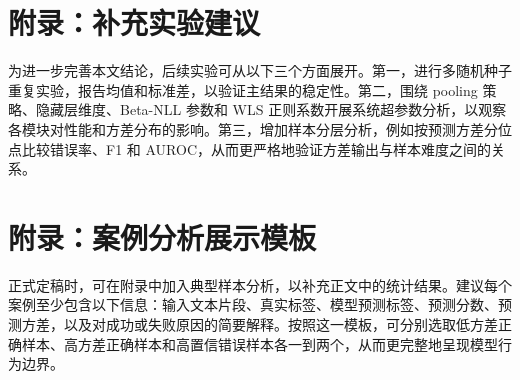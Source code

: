 \section{附录：补充实验建议}
为进一步完善本文结论，后续实验可从以下三个方面展开。第一，进行多随机种子重复实验，报告均值和标准差，以验证主结果的稳定性。第二，围绕 pooling 策略、隐藏层维度、Beta-NLL 参数和 WLS 正则系数开展系统超参数分析，以观察各模块对性能和方差分布的影响。第三，增加样本分层分析，例如按预测方差分位点比较错误率、F1 和 AUROC，从而更严格地验证方差输出与样本难度之间的关系。

\section{附录：案例分析展示模板}
正式定稿时，可在附录中加入典型样本分析，以补充正文中的统计结果。建议每个案例至少包含以下信息：输入文本片段、真实标签、模型预测标签、预测分数、预测方差，以及对成功或失败原因的简要解释。按照这一模板，可分别选取低方差正确样本、高方差正确样本和高置信错误样本各一到两个，从而更完整地呈现模型行为边界。
